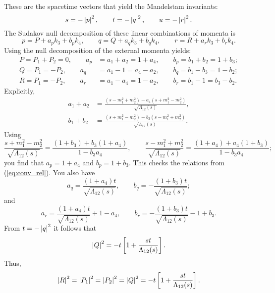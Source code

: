 These are the spacetime vectors that yield the Mandelstam invariants:
\begin{equation}
	s = -\left\lvert p \right\rvert^{2}, \qquad t = -\left\lvert q \right\rvert^{2}, \qquad u = -\left\lvert r \right\rvert^{2}.
\end{equation}
The Sudakov null decomposition of these linear combinations of momenta is
\begin{equation}
	p = P + a_{p} k_{3} + b_{p} k_{4}, \qquad q = Q + a_{q} k_{3} + b_{q} k_{4}, \qquad r = R + a_{r} k_{3} + b_{r} k_{4}.
\end{equation}
Using the null decomposition of the external momenta yields:
\begin{align}
	P = P_{1} + P_{2} = 0, \qquad a_{p} &= a_{1} + a_{2} = 1 + a_{4}, \qquad b_{p} = b_{1} + b_{2} = 1 + b_{3}; \\
	Q = P_{1} = -P_{2}, \qquad a_{q} &= a_{1} - 1 = a_{4} - a_{2}, \qquad b_{q} = b_{1} - b_{3} = 1 - b_{2}; \\
	R = P_{1} = -P_{2}, \qquad a_{r} &= a_{1} - a_{4} = 1 - a_{2}, \qquad b_{r} = b_{1} - 1 = b_{3} - b_{2}.
\end{align}
Explicitly,
\begin{align}
	a_{1} + a_{2} &= \frac{ \left(s - m_{1}^{2} + m_{2}^{2}\right) - a_{4} \left(s + m_{1}^{2} - m_{2}^{2} \right) }{\sqrt{\Lambda_{12}(s)}}, \\
	b_{1} + b_{2} &= \frac{ \left(s + m_{1}^{2} - m_{2}^{2}\right) - b_{3} \left(s - m_{1}^{2} + m_{2}^{2} \right) }{\sqrt{\Lambda_{12}(s)}}.
\end{align}
Using
\begin{equation}
	\frac{s + m_{1}^{2} - m_{2}^{2}}{\sqrt{\Lambda_{12}(s)}} = \frac{\left( 1 + b_{3} \right) + b_{3} \left( 1 + a_{4} \right)}{1 - b_{3} a_{4}}, \qquad \frac{s - m_{1}^{2} + m_{2}^{2}}{\sqrt{\Lambda_{12}(s)}} = \frac{\left( 1 + a_{4} \right) + a_{4} \left( 1 + b_{3} \right)}{1 - b_{3} a_{4}};
\end{equation}
you find that $a_{p} = 1 + a_{4}$ and $b_{p} = 1 + b_{3}$. This checks the relations from (\ref{eq:conv_rel}). You also have
\begin{equation}
	a_{q} = \frac{\left( 1 + a_{4} \right) t}{\sqrt{\Lambda_{12}(s)}}, \qquad
	b_{q} = -\frac{\left( 1 + b_{3} \right) t}{\sqrt{\Lambda_{12}(s)}};
\end{equation}
and
\begin{equation}
	a_{r} = \frac{\left( 1 + a_{4} \right) t}{\sqrt{\Lambda_{12}(s)}} + 1 - a_{4}, \qquad 
	b_{r} = - \frac{\left( 1 + b_{3} \right) t}{\sqrt{\Lambda_{12}(s)}} - 1 + b_{3}.
\end{equation}
From $t = -\left\lvert q \right\rvert^{2}$ it follows that
\begin{equation}
	\left\lvert Q \right\rvert^{2} = -t \left[ 1 + \frac{s t}{\Lambda_{12}(s)} \right].
\end{equation}
Thus,
\begin{equation}
	\left\lvert R \right\rvert^{2} = \left\lvert P_{1} \right\rvert^{2} = \left\lvert P_{2} \right\rvert^{2} = \left\lvert Q \right\rvert^{2} = -t \left[ 1 + \frac{s t}{\Lambda_{12}(s)} \right].
\end{equation}
